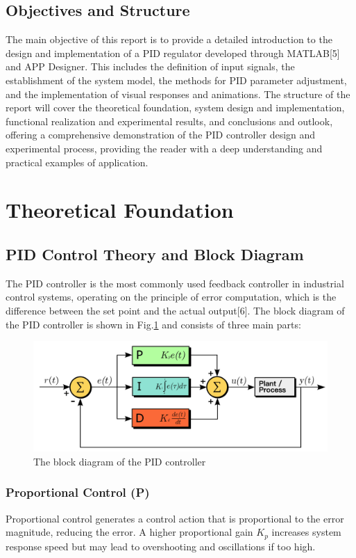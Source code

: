\documentclass[journal,twoside,web]{ieeecolor}
\begin{document}
\subsection{Objectives and Structure}
The main objective of this report is to provide a detailed introduction to the design and implementation of a PID regulator developed through MATLAB[5] and APP Designer. This includes the definition of input signals, the establishment of the system model, the methods for PID parameter adjustment, and the implementation of visual responses and animations. The structure of the report will cover the theoretical foundation, system design and implementation, functional realization and experimental results, and conclusions and outlook, offering a comprehensive demonstration of the PID controller design and experimental process, providing the reader with a deep understanding and practical examples of application.


\section{Theoretical Foundation}

\subsection{PID Control Theory and Block Diagram}
The PID controller is the most commonly used feedback controller in industrial control systems, operating on the principle of error computation, which is the difference between the set point and the actual output[6]. The block diagram of the PID controller is shown in Fig.\ref{PID} and consists of three main parts:
\begin{figure}[!t]
\centerline{\includegraphics[width=\columnwidth]{Images/PID.jpg}}
\caption{The block diagram of the PID controller}
\label{PID}
\end{figure}

\subsubsection{Proportional Control (P)}
{Proportional control generates a control action that is proportional to the error magnitude, reducing the error. A higher proportional gain \( K_p \) increases system response speed but may lead to overshooting and oscillations if too high.}
\end{document}
